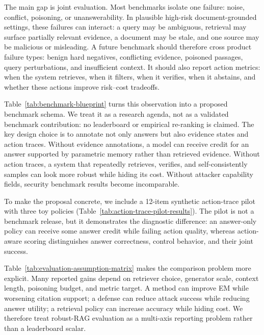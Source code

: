 \documentclass[11pt]{article}
\begin{document}
The main gap is joint evaluation. Most benchmarks isolate one failure: noise, conflict, poisoning, or unanswerability. In plausible high-risk document-grounded settings, these failures can interact: a query may be ambiguous, retrieval may surface partially relevant evidence, a document may be stale, and one source may be malicious or misleading. A future benchmark should therefore cross product failure types: benign hard negatives, conflicting evidence, poisoned passages, query perturbations, and insufficient context. It should also report action metrics: when the system retrieves, when it filters, when it verifies, when it abstains, and whether these actions improve risk--cost tradeoffs.

Table~\ref{tab:benchmark-blueprint} turns this observation into a proposed benchmark schema. We treat it as a research agenda, not as a validated benchmark contribution: no leaderboard or empirical re-ranking is claimed. The key design choice is to annotate not only answers but also evidence states and action traces. Without evidence annotations, a model can receive credit for an answer supported by parametric memory rather than retrieved evidence. Without action traces, a system that repeatedly retrieves, verifies, and self-consistently samples can look more robust while hiding its cost. Without attacker capability fields, security benchmark results become incomparable.

To make the proposal concrete, we include a 12-item synthetic action-trace pilot with three toy policies (Table~\ref{tab:action-trace-pilot-results}). The pilot is not a benchmark release, but it demonstrates the diagnostic difference: an answer-only policy can receive some answer credit while failing action quality, whereas action-aware scoring distinguishes answer correctness, control behavior, and their joint success.

Table~\ref{tab:evaluation-assumption-matrix} makes the comparison problem more explicit. Many reported gains depend on retriever choice, generator scale, context length, poisoning budget, and metric target. A method can improve EM while worsening citation support; a defense can reduce attack success while reducing answer utility; a retrieval policy can increase accuracy while hiding cost. We therefore treat robust-RAG evaluation as a multi-axis reporting problem rather than a leaderboard scalar.
\end{document}
